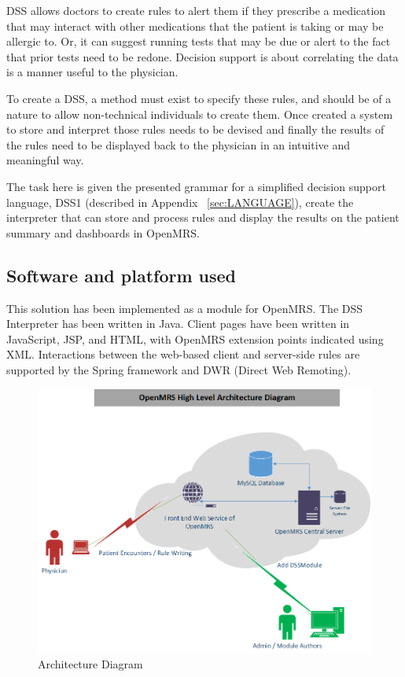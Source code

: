 \documentclass[12pt,letterpaper]{article}
\begin{document}
DSS allows doctors to create rules to alert them if they prescribe a medication that may interact with other medications that the patient is taking or may be allergic to.   Or, it can suggest running tests that may be due or alert to the fact that prior tests need to be redone.  Decision support is about correlating the data is a manner useful to the physician.

To create a DSS, a method must exist to specify these rules, and should be of a nature to allow non-technical individuals to create them.  Once created a system to store and interpret those rules needs to be devised and finally the results of the rules need to be displayed back to the physician in an intuitive and meaningful way.

The task here is given the presented grammar for a simplified decision support language, DSS1 (described in Appendix ~\ref{sec:LANGUAGE}), create the interpreter that can store and process rules and display the results on the patient summary and dashboards in OpenMRS.

\subsection{Software and platform used}

This solution has been implemented as a module for OpenMRS. The DSS Interpreter has been written in Java. Client pages have been written 
in JavaScript, JSP, and HTML, with OpenMRS extension points indicated using 
XML. Interactions between the web-based client and server-side rules are 
supported by the Spring framework and DWR (Direct Web Remoting).

\begin{figure}\begin{center}
\includegraphics[width=6.5in]{OpenMRS_Architecture.png}
\end{center}
\caption{Architecture Diagram} \label{fig:ARCHITECTURE}
\end{figure}
\end{document}
